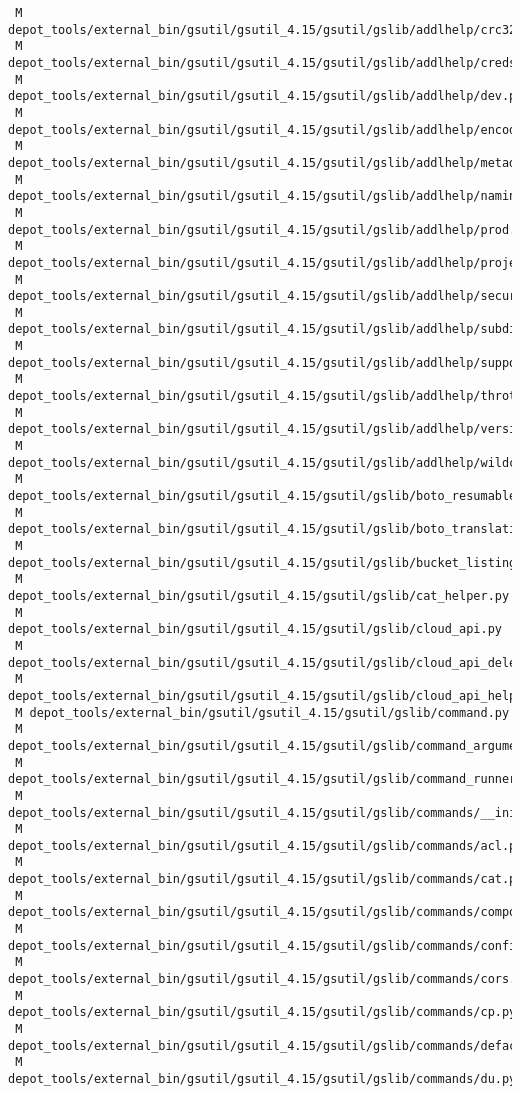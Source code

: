 \documentclass{article}
\begin{document}
\begin{verbatim}
 M depot_tools/external_bin/gsutil/gsutil_4.15/gsutil/gslib/addlhelp/crc32c.py
 M depot_tools/external_bin/gsutil/gsutil_4.15/gsutil/gslib/addlhelp/creds.py
 M depot_tools/external_bin/gsutil/gsutil_4.15/gsutil/gslib/addlhelp/dev.py
 M depot_tools/external_bin/gsutil/gsutil_4.15/gsutil/gslib/addlhelp/encoding.py
 M depot_tools/external_bin/gsutil/gsutil_4.15/gsutil/gslib/addlhelp/metadata.py
 M depot_tools/external_bin/gsutil/gsutil_4.15/gsutil/gslib/addlhelp/naming.py
 M depot_tools/external_bin/gsutil/gsutil_4.15/gsutil/gslib/addlhelp/prod.py
 M depot_tools/external_bin/gsutil/gsutil_4.15/gsutil/gslib/addlhelp/projects.py
 M depot_tools/external_bin/gsutil/gsutil_4.15/gsutil/gslib/addlhelp/security.py
 M depot_tools/external_bin/gsutil/gsutil_4.15/gsutil/gslib/addlhelp/subdirs.py
 M depot_tools/external_bin/gsutil/gsutil_4.15/gsutil/gslib/addlhelp/support.py
 M depot_tools/external_bin/gsutil/gsutil_4.15/gsutil/gslib/addlhelp/throttling.py
 M depot_tools/external_bin/gsutil/gsutil_4.15/gsutil/gslib/addlhelp/versions.py
 M depot_tools/external_bin/gsutil/gsutil_4.15/gsutil/gslib/addlhelp/wildcards.py
 M depot_tools/external_bin/gsutil/gsutil_4.15/gsutil/gslib/boto_resumable_upload.py
 M depot_tools/external_bin/gsutil/gsutil_4.15/gsutil/gslib/boto_translation.py
 M depot_tools/external_bin/gsutil/gsutil_4.15/gsutil/gslib/bucket_listing_ref.py
 M depot_tools/external_bin/gsutil/gsutil_4.15/gsutil/gslib/cat_helper.py
 M depot_tools/external_bin/gsutil/gsutil_4.15/gsutil/gslib/cloud_api.py
 M depot_tools/external_bin/gsutil/gsutil_4.15/gsutil/gslib/cloud_api_delegator.py
 M depot_tools/external_bin/gsutil/gsutil_4.15/gsutil/gslib/cloud_api_helper.py
 M depot_tools/external_bin/gsutil/gsutil_4.15/gsutil/gslib/command.py
 M depot_tools/external_bin/gsutil/gsutil_4.15/gsutil/gslib/command_argument.py
 M depot_tools/external_bin/gsutil/gsutil_4.15/gsutil/gslib/command_runner.py
 M depot_tools/external_bin/gsutil/gsutil_4.15/gsutil/gslib/commands/__init__.py
 M depot_tools/external_bin/gsutil/gsutil_4.15/gsutil/gslib/commands/acl.py
 M depot_tools/external_bin/gsutil/gsutil_4.15/gsutil/gslib/commands/cat.py
 M depot_tools/external_bin/gsutil/gsutil_4.15/gsutil/gslib/commands/compose.py
 M depot_tools/external_bin/gsutil/gsutil_4.15/gsutil/gslib/commands/config.py
 M depot_tools/external_bin/gsutil/gsutil_4.15/gsutil/gslib/commands/cors.py
 M depot_tools/external_bin/gsutil/gsutil_4.15/gsutil/gslib/commands/cp.py
 M depot_tools/external_bin/gsutil/gsutil_4.15/gsutil/gslib/commands/defacl.py
 M depot_tools/external_bin/gsutil/gsutil_4.15/gsutil/gslib/commands/du.py

\end{verbatim}
\end{document}
